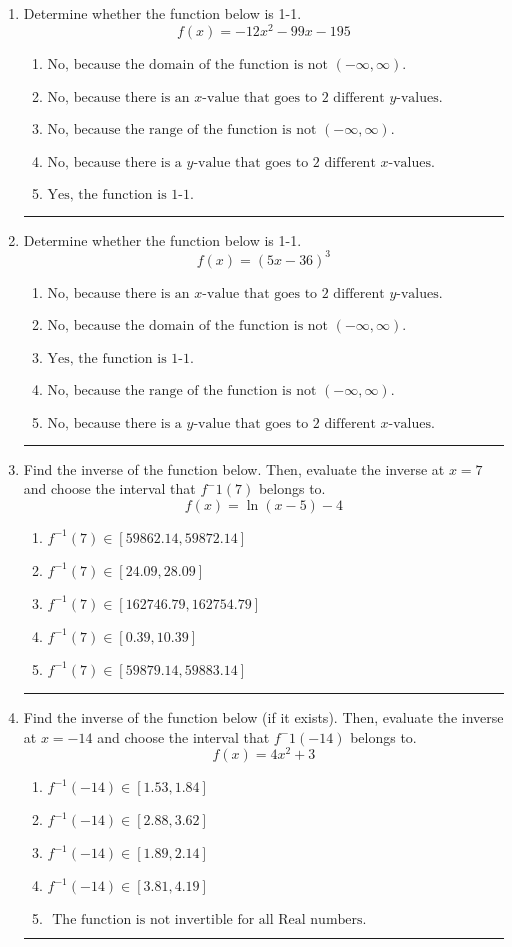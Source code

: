 \documentclass[14pt]{extbook}
\newcommand{\litem}[1]{\item#1\hspace*{-1cm}\rule{\textwidth}{0.4pt}}
\begin{document}
\begin{enumerate}
{\begin{enumerate}[label=\Alph*.]
\end{enumerate} }
\litem{
Determine whether the function below is 1-1.\[ f(x) = -12 x^2 - 99 x - 195 \]\begin{enumerate}[label=\Alph*.]
\item \( \text{No, because the domain of the function is not $(-\infty, \infty)$.} \)
\item \( \text{No, because there is an $x$-value that goes to 2 different $y$-values.} \)
\item \( \text{No, because the range of the function is not $(-\infty, \infty)$.} \)
\item \( \text{No, because there is a $y$-value that goes to 2 different $x$-values.} \)
\item \( \text{Yes, the function is 1-1.} \)

\end{enumerate} }
\litem{
Determine whether the function below is 1-1.\[ f(x) = (5 x - 36)^3 \]\begin{enumerate}[label=\Alph*.]
\item \( \text{No, because there is an $x$-value that goes to 2 different $y$-values.} \)
\item \( \text{No, because the domain of the function is not $(-\infty, \infty)$.} \)
\item \( \text{Yes, the function is 1-1.} \)
\item \( \text{No, because the range of the function is not $(-\infty, \infty)$.} \)
\item \( \text{No, because there is a $y$-value that goes to 2 different $x$-values.} \)

\end{enumerate} }
\litem{
Find the inverse of the function below. Then, evaluate the inverse at $x = 7$ and choose the interval that $f^-1(7)$ belongs to.\[ f(x) = \ln{(x-5)}-4 \]\begin{enumerate}[label=\Alph*.]
\item \( f^{-1}(7) \in [59862.14, 59872.14] \)
\item \( f^{-1}(7) \in [24.09, 28.09] \)
\item \( f^{-1}(7) \in [162746.79, 162754.79] \)
\item \( f^{-1}(7) \in [0.39, 10.39] \)
\item \( f^{-1}(7) \in [59879.14, 59883.14] \)

\end{enumerate} }
\litem{
Find the inverse of the function below (if it exists). Then, evaluate the inverse at $x = -14$ and choose the interval that $f^-1(-14)$ belongs to.\[ f(x) = 4 x^2 + 3 \]\begin{enumerate}[label=\Alph*.]
\item \( f^{-1}(-14) \in [1.53, 1.84] \)
\item \( f^{-1}(-14) \in [2.88, 3.62] \)
\item \( f^{-1}(-14) \in [1.89, 2.14] \)
\item \( f^{-1}(-14) \in [3.81, 4.19] \)
\item \( \text{ The function is not invertible for all Real numbers. } \)


\end{enumerate}}
\end{enumerate}
\end{document}
